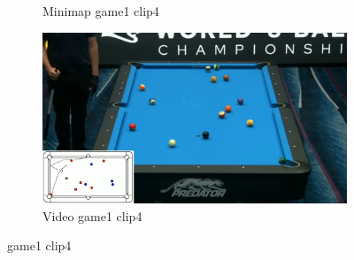\begin{figure}[H]
\begin{subfigure}[b]{0.48\textwidth}
    	\caption{Minimap game1 clip4}
    	\label{fig: game1_clip4_minimap}
    \end{subfigure}
    \begin{subfigure}[b]{0.48\textwidth}
    	\centering
    	\includegraphics[width=\textwidth]{images/Video/game1_clip4_video.jpg}
    	\caption{Video game1 clip4}
    	\label{fig: game1_clip4_video}
    \end{subfigure}
    
	\caption{game1 clip4}
\end{figure}


